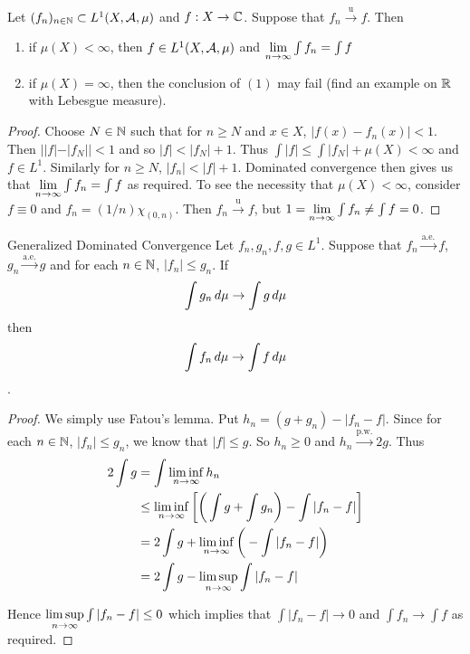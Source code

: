 \documentclass{book}
\begin{document}
	\begin{ex}  
		Let $(f_n)_{n \in \mathbb{N}} \subset L^1(X, \mathcal{A}, \mu)$ and $f:X \rightarrow \mathbb{C}$. Suppose that $f_n \xrightarrow{\text{u}} f$. Then 
		\begin{enumerate}
			\item if $\mu(X) < \infty$, then $f \in L^1(X, \mathcal{A}, \mu)$ and $\lim \limits_{n \rightarrow \infty} \int f_n = \int f$
			\item if $\mu(X) = \infty$, then the conclusion of $(1)$ may fail (find an example on $\mathbb{R}$ with Lebesgue measure).
		\end{enumerate}
	\end{ex}
	
	\begin{proof}
		Choose $N \in \mathbb{N}$ such that for $n \geq N$ and $x \in X$, $|f(x) - f_n(x)| < 1$. Then $||f| - |f_N|| < 1$ and so $|f| < |f_N| +1$. Thus $\int |f| \leq \int |f_N| +\mu(X) < \infty$ and $f \in L^1$. Similarly for $n \geq N$, $|f_n| < |f|+ 1$. Dominated convergence then gives us that $\lim \limits_{n \rightarrow \infty} \int f_n = \int f$ as required. To see the necessity that $\mu(X) < \infty$, consider $f \equiv 0$ and $f_n = (1/n) \chi_{(0,n)}$. Then $f_n \xrightarrow{\text{u}} f$, but $1 = \lim \limits_{n \rightarrow \infty} \int f_n \neq \int f = 0$.  
	\end{proof}
	
	\begin{ex}  {Generalized Dominated Convergence}
		Let $f_n,g_n,f,g \in L^1$. Suppose that $f_n \xrightarrow{\text{a.e.}} f$, $g_n \xrightarrow{\text{a.e.}} g$ and for each $n \in \mathbb{N}$, $|f_n| \leq g_n$. If $$\int g_n \, d \mu \rightarrow \int g \, d \mu $$ then $$\int f_n \, d \mu \rightarrow \int f \, d \mu$$.
	\end{ex}
	
	
	\begin{proof}
		We simply use Fatou's lemma. Put $h_n = (g + g_n) - |f_n - f|$. Since for each $n \in \mathbb{N}$, $|f_n| \leq g_n$, we know that $|f| \leq g$. So $h_n \geq 0$ and $h_n \xrightarrow{\text{p.w.}} 2g$. Thus 
		\begin{align*}
			2\int g 
			&= \int \liminf \limits_{n \rightarrow \infty} h_n\\
			&\leq \liminf \limits_{n \rightarrow \infty} \bigg[ \bigg(\int g +\int g_n\bigg) - \int |f_n -f|\bigg]\\
			&= 2\int g + \liminf \limits_{n \rightarrow \infty} \bigg( - \int |f_n - f| \bigg)\\
			&= 2\int g - \limsup \limits_{n \rightarrow \infty} \int |f_n - f| 
		\end{align*}
		
		Hence $\limsup \limits_{n \rightarrow \infty} \int |f_n - f|  \leq 0$ which implies that $\int |f_n - f| \rightarrow 0$ and $\int f_n \rightarrow \int f$ as required. 
	\end{proof}
	
\end{document}
